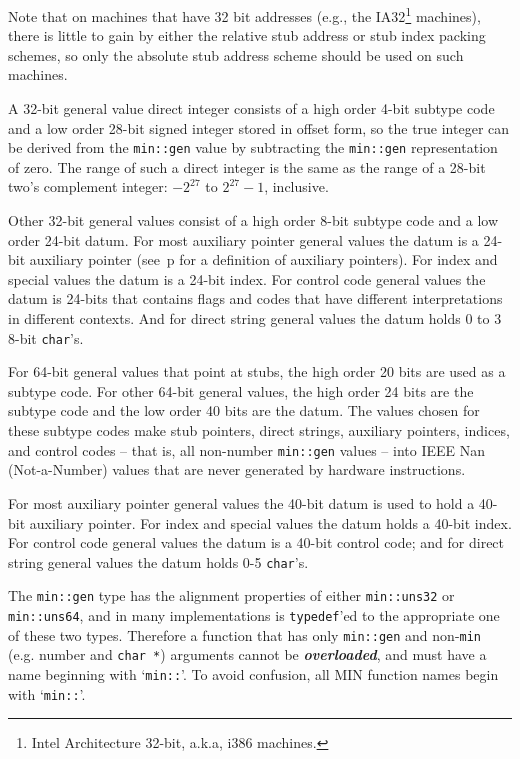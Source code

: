 \documentclass[12pt]{article}
\newcommand{\ikey}[2]{{\bf \em #1}\index{#2}}
\newcommand{\pagref}[1]{p\pageref{#1}}
\begin{document}
Note that on machines that have 32 bit addresses (e.g.,
the IA32\footnote{Intel Architecture 32-bit, a.k.a, i386 machines.}
machines), there is little to gain by either the relative stub address
or stub index packing schemes,
so only the absolute stub address scheme should be used on such machines.

A 32-bit general value direct integer consists of a high order 4-bit
subtype code and a low order 28-bit signed integer stored in offset form,
so the true integer can be derived from the {\tt min::gen} value by
subtracting the {\tt min::gen} representation of zero.
The range of such a direct integer is the same as the range of a 28-bit
two's complement integer: $-2^{27}$ to $2^{27}-1$, inclusive.

Other 32-bit general values consist of a high order
8-bit subtype code and a low order 24-bit datum.
For most auxiliary pointer
general values the datum is a 24-bit auxiliary pointer
(see~\pagref{OBJECT-BODY-AUXILIARY-POINTER}
for a definition of auxiliary pointers).
For index and special values the datum is a 24-bit index.
For control code general values the datum is 24-bits that
contains flags and codes that have different interpretations in different
contexts.  And for direct string general values the datum
holds 0 to 3 8-bit {\tt char}'s.

For 64-bit general values that point at stubs, the high order 20 bits
are used as a subtype code.  For other 64-bit general values, the high
order 24 bits are the subtype code and the low order 40 bits are the datum.
The values chosen for these subtype codes make stub pointers, direct strings,
auxiliary pointers, indices, and control codes -- that is, all non-number
{\tt min::gen} values --
into IEEE Nan (Not-a-Number)
values that are never generated by hardware instructions.

For most auxiliary pointer general values the 40-bit datum is used to hold
a 40-bit auxiliary pointer.
For index and special values the datum holds a 40-bit index.
For control code general values the datum is a 40-bit control code;
and for direct string general values the datum holds 0-5 {\tt char}'s.

The {\tt min::gen} type has the alignment
properties of either {\tt min::uns32} or {\tt min::uns64},
and in many implementations is {\tt typedef}'ed to the appropriate one
of these two types.  Therefore a function that has only
{\tt min::gen} and non-{\tt min} (e.g. number and {\tt char *}) arguments
cannot be \ikey{overloaded}{overloading!rationale}\label{OVERLOADING-RATIONALE},
and must have a name beginning with `{\tt min::}'.
To avoid confusion, all MIN function names begin with `{\tt min::}'.
\end{document}
